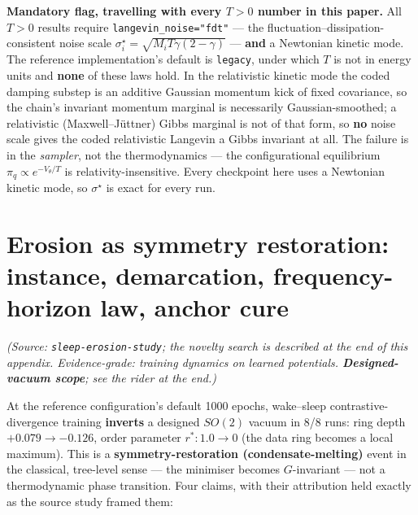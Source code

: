 \documentclass{article}
\begin{document}
\textbf{Mandatory flag, travelling with every $T>0$ number in this paper.} All $T>0$ results require \texttt{langevin\_noise="fdt"} --- the fluctuation--dissipation-consistent noise scale $\sigma^\star_i=\sqrt{M_iT\gamma(2-\gamma)}$ --- \textbf{and} a Newtonian kinetic mode. The reference implementation's default is \texttt{legacy}, under which $T$ is not in energy units and \textbf{none} of these laws hold. In the relativistic kinetic mode the coded damping substep is an additive Gaussian momentum kick of fixed covariance, so the chain's invariant momentum marginal is necessarily Gaussian-smoothed; a relativistic (Maxwell--J\"uttner) Gibbs marginal is not of that form, so \textbf{no} noise scale gives the coded relativistic Langevin a Gibbs invariant at all. The failure is in the \emph{sampler}, not the thermodynamics --- the configurational equilibrium $\pi_q\propto e^{-V_\theta/T}$ is relativity-insensitive. Every checkpoint here uses a Newtonian kinetic mode, so $\sigma^\star$ is exact for every run.

\section{Erosion as symmetry restoration: instance, demarcation, frequency-horizon law, anchor cure}

\emph{(Source: \texttt{sleep-erosion-study}; the novelty search is described at the end of this appendix. Evidence-grade: training dynamics on learned potentials. \textbf{Designed-vacuum scope}; see the rider at the end.)}

At the reference configuration's default 1000 epochs, wake--sleep contrastive-divergence training \textbf{inverts} a designed $SO(2)$ vacuum in 8/8 runs: ring depth $+0.079\to-0.126$, order parameter $r^*:1.0\to0$ (the data ring becomes a local maximum). This is a \textbf{symmetry-restoration (condensate-melting)} event in the classical, tree-level sense --- the minimiser becomes $G$-invariant --- not a thermodynamic phase transition. Four claims, with their attribution held exactly as the source study framed them:
\end{document}
